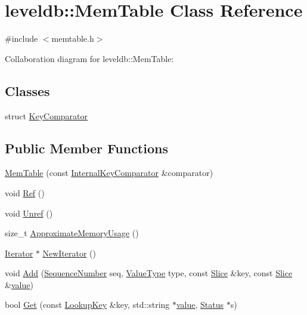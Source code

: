 \hypertarget{classleveldb_1_1_mem_table}{\section{leveldb\-:\-:Mem\-Table Class Reference}
\label{classleveldb_1_1_mem_table}
}


{\ttfamily \#include $<$memtable.\-h$>$}



Collaboration diagram for leveldb\-:\-:Mem\-Table\-:
\subsection*{Classes}
\begin{DoxyCompactItemize}
\item 
struct \hyperlink{structleveldb_1_1_mem_table_1_1_key_comparator}{Key\-Comparator}
\end{DoxyCompactItemize}
\subsection*{Public Member Functions}
\begin{DoxyCompactItemize}
\item 
\hyperlink{classleveldb_1_1_mem_table_a23add92a4a6e5d1521f3b6695dba5c2d}{Mem\-Table} (const \hyperlink{classleveldb_1_1_internal_key_comparator}{Internal\-Key\-Comparator} \&comparator)
\item 
void \hyperlink{classleveldb_1_1_mem_table_a332484cffd2ebc7d6a51f22eeeeeb71b}{Ref} ()
\item 
void \hyperlink{classleveldb_1_1_mem_table_a5dcbf17d1477e6098a30dadd0745cfb2}{Unref} ()
\item 
size\-\_\-t \hyperlink{classleveldb_1_1_mem_table_a667a1ada274201f0bdd3615baf1bd882}{Approximate\-Memory\-Usage} ()
\item 
\hyperlink{classleveldb_1_1_iterator}{Iterator} $\ast$ \hyperlink{classleveldb_1_1_mem_table_a396b8ba5e2ea0de25b666026f3b9235f}{New\-Iterator} ()
\item 
void \hyperlink{classleveldb_1_1_mem_table_a37bec80954badb2354426aa175e9371f}{Add} (\hyperlink{namespaceleveldb_a5481ededd221c36d652c371249f869fa}{Sequence\-Number} seq, \hyperlink{namespaceleveldb_acc038cb0d608414730cafa459a4ba866}{Value\-Type} type, const \hyperlink{classleveldb_1_1_slice}{Slice} \&key, const \hyperlink{classleveldb_1_1_slice}{Slice} \&\hyperlink{cache_8cc_a0f61d63b009d0880a89c843bd50d8d76}{value})
\item 
bool \hyperlink{classleveldb_1_1_mem_table_af94f80a5909a440d0675afa68f8765c5}{Get} (const \hyperlink{classleveldb_1_1_lookup_key}{Lookup\-Key} \&key, std\-::string $\ast$\hyperlink{cache_8cc_a0f61d63b009d0880a89c843bd50d8d76}{value}, \hyperlink{classleveldb_1_1_status}{Status} $\ast$s)
\end{DoxyCompactItemize}
